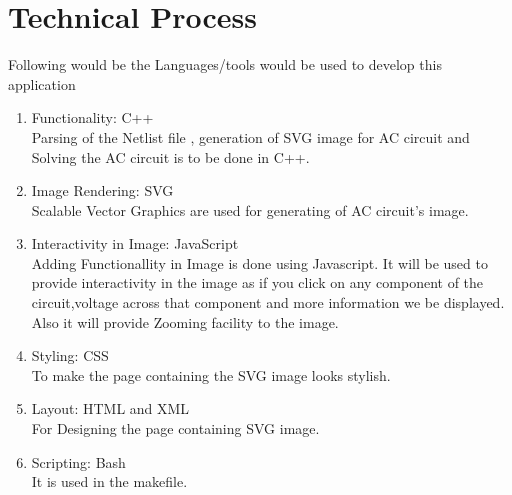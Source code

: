 \documentclass[12pt]{extarticle}
\begin{document}
\section{Technical Process}
Following would be the Languages/tools would be used to develop this application
\begin{enumerate}
\item Functionality: C++\\
	Parsing of the  Netlist file , generation of SVG image for AC circuit and Solving the AC circuit is to be done in C++.
\item Image Rendering: SVG\\
Scalable Vector Graphics are used for generating of AC circuit's image.
\item Interactivity in Image: JavaScript\\
Adding Functionallity in Image is done using Javascript. It will be used to provide interactivity in the image as if you click on any component of the circuit,voltage across that component and more information we be displayed. Also it will provide Zooming facility to the image.
\item Styling: CSS\\
To make the page containing the SVG image looks stylish.
\item Layout: HTML and XML\\
For Designing the page containing SVG image.
\item Scripting: Bash\\
It is used in the makefile.
\end{enumerate}
\end{document}
